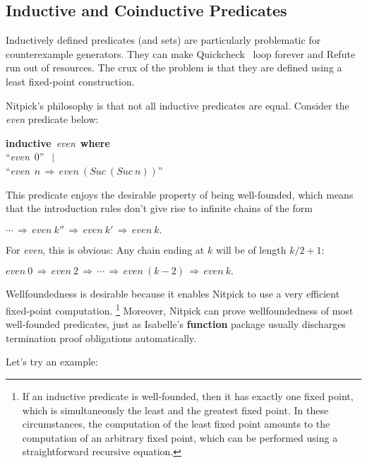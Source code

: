 \documentclass[a4paper,12pt]{article}
\begin{document}
\subsection{Inductive and Coinductive Predicates}
\label{inductive-and-coinductive-predicates}

Inductively defined predicates (and sets) are particularly problematic for
counterexample generators. They can make Quickcheck~\cite{berghofer-nipkow-2004}
loop forever and Refute~\cite{weber-2008} run out of resources. The crux of
the problem is that they are defined using a least fixed-point construction.

Nitpick's philosophy is that not all inductive predicates are equal. Consider
the \textit{even} predicate below:

\prew
\textbf{inductive}~\textit{even}~\textbf{where} \\
``\textit{even}~0'' $\,\mid$ \\
``\textit{even}~$n\,\Longrightarrow\, \textit{even}~(\textit{Suc}~(\textit{Suc}~n))$''
\postw

This predicate enjoys the desirable property of being well-founded, which means
that the introduction rules don't give rise to infinite chains of the form

\prew
$\cdots\,\Longrightarrow\, \textit{even}~k''
       \,\Longrightarrow\, \textit{even}~k'
       \,\Longrightarrow\, \textit{even}~k.$
\postw

For \textit{even}, this is obvious: Any chain ending at $k$ will be of length
$k/2 + 1$:

\prew
$\textit{even}~0\,\Longrightarrow\, \textit{even}~2\,\Longrightarrow\, \cdots
       \,\Longrightarrow\, \textit{even}~(k - 2)
       \,\Longrightarrow\, \textit{even}~k.$
\postw

Wellfoundedness is desirable because it enables Nitpick to use a very efficient
fixed-point computation.%
\footnote{If an inductive predicate is
well-founded, then it has exactly one fixed point, which is simultaneously the
least and the greatest fixed point. In these circumstances, the computation of
the least fixed point amounts to the computation of an arbitrary fixed point,
which can be performed using a straightforward recursive equation.}
Moreover, Nitpick can prove wellfoundedness of most well-founded predicates,
just as Isabelle's \textbf{function} package usually discharges termination
proof obligations automatically.

Let's try an example:
\end{document}
